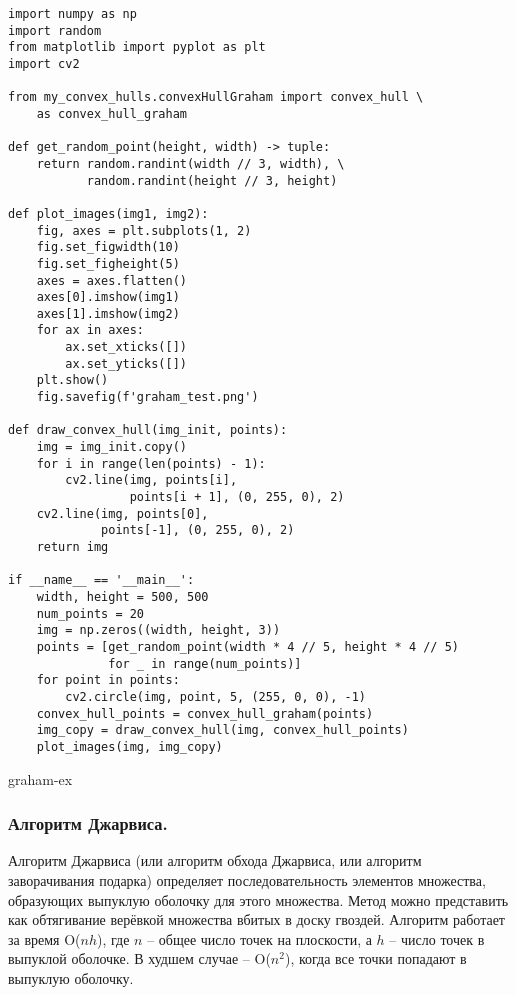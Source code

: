 \begin{verbatim}
import numpy as np
import random
from matplotlib import pyplot as plt
import cv2

from my_convex_hulls.convexHullGraham import convex_hull \
    as convex_hull_graham

def get_random_point(height, width) -> tuple:
    return random.randint(width // 3, width), \
           random.randint(height // 3, height)

def plot_images(img1, img2):
    fig, axes = plt.subplots(1, 2)
    fig.set_figwidth(10)
    fig.set_figheight(5)
    axes = axes.flatten()
    axes[0].imshow(img1)
    axes[1].imshow(img2)
    for ax in axes:
        ax.set_xticks([])
        ax.set_yticks([])
    plt.show()
    fig.savefig(f'graham_test.png')

def draw_convex_hull(img_init, points):
    img = img_init.copy()
    for i in range(len(points) - 1):
        cv2.line(img, points[i],
                 points[i + 1], (0, 255, 0), 2)
    cv2.line(img, points[0],
             points[-1], (0, 255, 0), 2)
    return img

if __name__ == '__main__':
    width, height = 500, 500
    num_points = 20
    img = np.zeros((width, height, 3))
    points = [get_random_point(width * 4 // 5, height * 4 // 5)
              for _ in range(num_points)]
    for point in points:
        cv2.circle(img, point, 5, (255, 0, 0), -1)
    convex_hull_points = convex_hull_graham(points)
    img_copy = draw_convex_hull(img, convex_hull_points)
    plot_images(img, img_copy)
\end{verbatim}

{graham-ex}

\subsubsection{Алгоритм Джарвиса.}

Алгоритм Джарвиса \cite{jarvis} (или алгоритм обхода Джарвиса, или алгоритм
заворачивания подарка) определяет последовательность элементов
множества, образующих выпуклую оболочку для этого множества. Метод
можно представить как обтягивание верёвкой множества вбитых в доску
гвоздей. Алгоритм работает за время  O($nh$), где $n$ -- общее число 
точек на плоскости, а $h$ -- число точек в выпуклой оболочке. В 
худшем случае -- O($n^2$), когда все точки попадают в выпуклую
оболочку.

